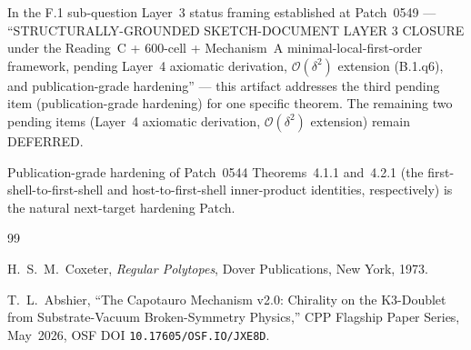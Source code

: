 \documentclass[11pt,letterpaper]{article}
\newcommand{\Eorder}[1]{\mathcal{O}(\delta^{#1})}
\begin{document}
In the F.1 sub-question Layer~3 status framing established at Patch~0549 --- ``STRUCTURALLY-GROUNDED SKETCH-DOCUMENT LAYER 3 CLOSURE under the Reading~C + 600-cell + Mechanism~A minimal-local-first-order framework, pending Layer~4 axiomatic derivation, $\mathcal{O}(\delta^2)$ extension (B.1.q6), and publication-grade hardening'' --- this artifact addresses the third pending item (publication-grade hardening) for one specific theorem. The remaining two pending items (Layer~4 axiomatic derivation, $\Eorder{2}$ extension) remain DEFERRED.

Publication-grade hardening of Patch~0544 Theorems~4.1.1 and~4.2.1 (the first-shell-to-first-shell and host-to-first-shell inner-product identities, respectively) is the natural next-target hardening Patch.


\begin{thebibliography}{99}

H.~S.~M.~Coxeter,
\textit{Regular Polytopes},
Dover Publications, New York, 1973.

T.~L.~Abshier,
``The Capotauro Mechanism v2.0: Chirality on the K3-Doublet from Substrate-Vacuum Broken-Symmetry Physics,''
CPP Flagship Paper Series, May~2026, OSF DOI \texttt{10.17605/OSF.IO/JXE8D}.

\end{thebibliography}
\end{document}
